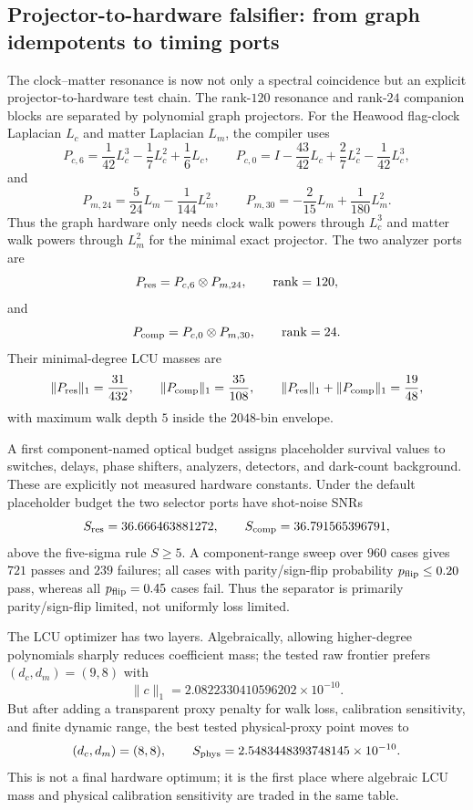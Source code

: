\subsection{Projector-to-hardware falsifier: from graph idempotents to timing ports}
\label{sec:projector-hardware-falsifier}

The clock--matter resonance is now not only a spectral coincidence but an explicit
projector-to-hardware test chain.  The rank-$120$ resonance and rank-$24$
companion blocks are separated by polynomial graph projectors.  For the Heawood
flag-clock Laplacian $L_c$ and matter Laplacian $L_m$, the compiler uses
\[
P_{c,6}=\frac{1}{42}L_c^3-\frac17L_c^2+\frac16L_c,
\qquad
P_{c,0}=I-\frac{43}{42}L_c+\frac27L_c^2-\frac{1}{42}L_c^3,
\]
and
\[
P_{m,24}=\frac{5}{24}L_m-\frac{1}{144}L_m^2,
\qquad
P_{m,30}=-\frac{2}{15}L_m+\frac{1}{180}L_m^2.
\]
Thus the graph hardware only needs clock walk powers through $L_c^3$ and matter
walk powers through $L_m^2$ for the minimal exact projector.  The two analyzer
ports are
\[
P_{\rm res}=P_{c,6}\otimes P_{m,24},\qquad \mathrm{rank}=120,
\]
and
\[
P_{\rm comp}=P_{c,0}\otimes P_{m,30},\qquad \mathrm{rank}=24.
\]
Their minimal-degree LCU masses are
\[
\|P_{\rm res}\|_1=\frac{31}{432},\qquad
\|P_{\rm comp}\|_1=\frac{35}{108},\qquad
\|P_{\rm res}\|_1+\|P_{\rm comp}\|_1=\frac{19}{48},
\]
with maximum walk depth $5$ inside the $2048$-bin envelope.

A first component-named optical budget assigns placeholder survival values to
switches, delays, phase shifters, analyzers, detectors, and dark-count background.
These are explicitly not measured hardware constants.  Under the default
placeholder budget the two selector ports have shot-noise SNRs
\[
S_{\rm res}=36.666463881272,\qquad
S_{\rm comp}=36.791565396791,
\]
above the five-sigma rule $S\ge5$.  A component-range sweep over $960$ cases gives
$721$ passes and $239$ failures; all cases with parity/sign-flip probability
$p_{\rm flip}\le0.20$ pass, whereas all $p_{\rm flip}=0.45$ cases fail.  Thus the
separator is primarily parity/sign-flip limited, not uniformly loss limited.

The LCU optimizer has two layers.  Algebraically, allowing higher-degree
polynomials sharply reduces coefficient mass; the tested raw frontier prefers
$(d_c,d_m)=(9,8)$ with
\[
\|c\|_1=2.0822330410596202\times10^{-10}.
\]
But after adding a transparent proxy penalty for walk loss, calibration
sensitivity, and finite dynamic range, the best tested physical-proxy point moves
to
\[
(d_c,d_m)=(8,8),\qquad
S_{\rm phys}=2.5483448393748145\times10^{-10}.
\]
This is not a final hardware optimum; it is the first place where algebraic LCU
mass and physical calibration sensitivity are traded in the same table.

